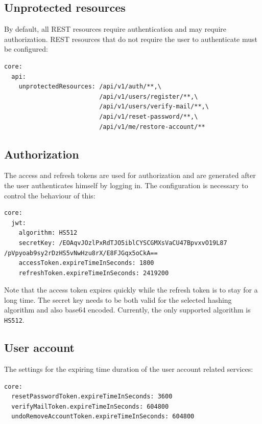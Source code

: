 \documentclass[a4paper,twoside,12pt]{book}
\begin{document}
\subsection{Unprotected resources}

By default, all REST resources require authentication and may require authorization. REST resources that do not require the user to authenticate must be configured:
\begin{verbatim}
core:
  api:
    unprotectedResources: /api/v1/auth/**,\
                          /api/v1/users/register/**,\
                          /api/v1/users/verify-mail/**,\
                          /api/v1/reset-password/**,\
                          /api/v1/me/restore-account/**
\end{verbatim}

\subsection{Authorization}

The access and refresh tokens are used for authorization and are generated after the user authenticates himself by logging in. The configuration is necessary to control the behaviour of this:
\begin{verbatim}
core:
  jwt:
    algorithm: HS512
    secretKey: /EOAqvJOzlPxRdTJO5iblCYSCGMXsVaCU47BpvxvO19L87 /pVpyoab9sy2rDzHS5vNwHzu8rX/E8FJGqx5oCkA==
    accessToken.expireTimeInSeconds: 1800
    refreshToken.expireTimeInSeconds: 2419200
\end{verbatim}

Note that the access token expires quickly while the refresh token is to stay for a long time. The secret key needs to be both valid for the selected hashing algorithm and also base64 encoded. Currently, the only supported algorithm is \verb|HS512|.

\subsection{User account}

The settings for the expiring time duration of the user account related services:

\begin{verbatim}
core:
  resetPasswordToken.expireTimeInSeconds: 3600
  verifyMailToken.expireTimeInSeconds: 604800
  undoRemoveAccountToken.expireTimeInSeconds: 604800
\end{verbatim}
\end{document}
